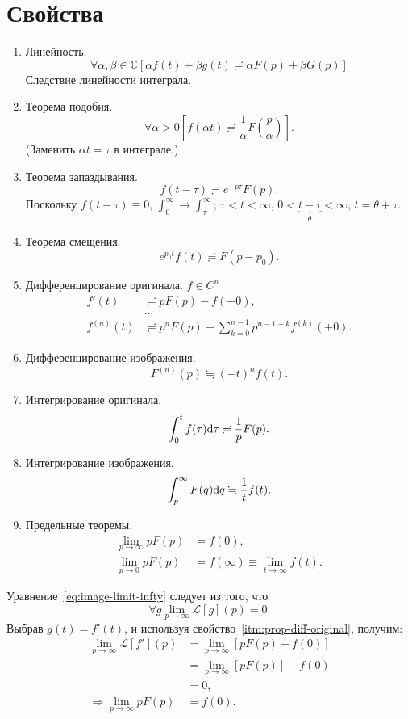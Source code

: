 \documentclass[12pt]{report}
\renewcommand{\L}{\mathcal L}
\renewcommand{\C}{\mathbb C}
\begin{document}
\section{Свойства~\cite{Dubkov:Lecture}}
\begin{enumerate}
	\item Линейность.
	\[
	\forall\alpha,\beta\in\C\left[\alpha f(t)+\beta g(t) \risingdotseq \alpha F(p) + \beta G(p)\right]
	\]
	Следствие линейности интеграла.
	\item Теорема подобия.
	\[
	\forall\alpha>0 \left[f(\alpha t) \risingdotseq \frac 1\alpha F\left(\frac p\alpha\right) \right].
	\]
	(Заменить $\alpha t = \tau$ в интеграле.)
	\item Теорема запаздывания.\label{itm:prop-offset}
	\[
	f(t-\tau) \risingdotseq e^{-p\tau} F(p).
	\]
	Поскольку $f(t-\tau) \equiv 0$, $\int_0^\infty \to \int_\tau^\infty$; $\tau < t < \infty$, 
	$0 < \underbrace{t-\tau}_{\theta} < \infty$, $t = \theta + \tau$.
	\item Теорема смещения.
	\[
	e^{p_0t} f(t) \risingdotseq F(p-p_0).
	\]
	\item Дифференцирование оригинала. $f\in C^n$ \label{itm:prop-diff-original}
	\begin{align*}
	f'(t) &\risingdotseq p F(p) - f(+0), \\
	&\dots \\
	f^{(n)}(t) &\risingdotseq p^nF(p) -\sum_{k=0}^{n-1}p^{n-1-k}f^{(k)}(+0).
	\end{align*}
	\item Дифференцирование изображения.
	\[
	F^{(n)}(p) \fallingdotseq (-t)^nf(t).
	\]
	\item  Интегрирование оригинала.
	\[
	\int_0^t f(\tau)\mathrm d\tau \risingdotseq \frac 1p F(p).
	\]
	\item Интегрирование изображения.
	\[
	\int_p^\infty F(q)\mathrm d q \fallingdotseq \frac 1t f(t).
	\]
	\item Предельные теоремы.
	\begin{align}
		\lim\limits_{p\to \infty} pF(p) &= f(0), \label{eq:image-limit-infty}\\
		\lim\limits_{p\to0} pF(p) &= f(\infty) \equiv \lim_{t\to\infty}f(t). \label{eq:image-limit-0}
	\end{align}
\end{enumerate}
 \begin{rmk}
 	Уравнение~\eqref{eq:image-limit-infty} следует из того, что 
 	\[
 	\forall g  \lim\limits_{p\to \infty}\L [g] (p) = 0.
 	\]
 	Выбрав $g(t) = f'(t)$, и используя свойство~\ref{itm:prop-diff-original}, получим:
 	\begin{align*}
 		\lim\limits_{p\to \infty}\L [f'](p) &= \lim\limits_{p\to \infty}\left[p F(p) - f(0)\right] \\
 		&= \lim\limits_{p\to \infty} \left[p F(p) \right] - f(0) \\
 		&= 0, \\
 		\Rightarrow \lim\limits_{p\to \infty} pF(p) &= f(0).
 	\end{align*}
 \end{rmk}
\end{document}
